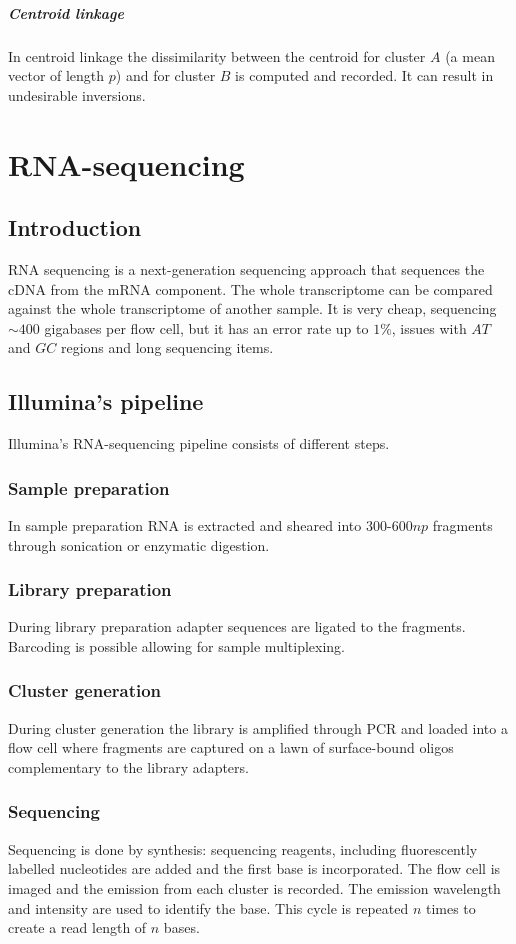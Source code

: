 				\subparagraph{Centroid linkage}
				In centroid linkage the dissimilarity between the centroid for cluster $A$ (a mean vector of length $p$) and for cluster $B$ is computed and recorded.
				It can result in undesirable inversions.

\section{RNA-sequencing}

	\subsection{Introduction}
	RNA sequencing is a next-generation sequencing approach that sequences the cDNA from the mRNA component.
	The whole transcriptome can be compared against the whole transcriptome of another sample.
	It is very cheap, sequencing $\sim 400$ gigabases per flow cell, but it has an error rate up to $1\%$, issues with $AT$ and $GC$ regions and long sequencing items.

	\subsection{Illumina's pipeline}
	Illumina's RNA-sequencing pipeline consists of different steps.

		\subsubsection{Sample preparation}
		In sample preparation RNA is extracted and sheared into $300$-$600np$ fragments through sonication or enzymatic digestion.

		\subsubsection{Library preparation}
		During library preparation adapter sequences are ligated to the fragments.
		Barcoding is possible allowing for sample multiplexing.

		\subsubsection{Cluster generation}
		During cluster generation the library is amplified through PCR and loaded into a flow cell where fragments are captured on a lawn of surface-bound oligos complementary to the library adapters.

		\subsubsection{Sequencing}
		Sequencing is done by synthesis: sequencing reagents, including fluorescently labelled nucleotides are added and the first base is incorporated.
		The flow cell is imaged and the emission from each cluster is recorded.
		The emission wavelength and intensity are used to identify the base.
		This cycle is repeated $n$ times to create a read length of $n$ bases.

